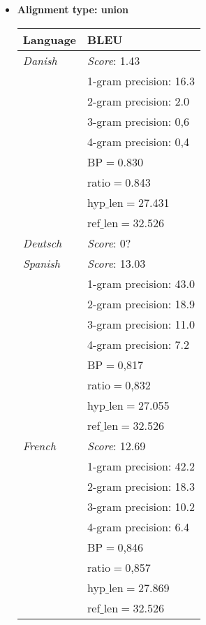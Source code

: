 \documentclass[11pt]{article}
\begin{document}
\begin{itemize}
\newpage
\item \textbf{Alignment type: union}

\begin{center}
    \begin{tabular}{ | l | l |}
    \hline
    \textbf{Language} & \textbf{BLEU} \\ 
    \hline
    \textit{Danish} & \textit{Score}: 1.43 \\
    & 1-gram precision: 16.3 \\
    & 2-gram precision: 2.0 \\
    & 3-gram precision: 0,6 \\
    & 4-gram precision: 0,4 \\
    & BP$=$0.830 \\
    & ratio$=$0.843 \\
    & hyp$\_$len$=$27.431 \\
    & ref$\_$len$=$32.526\\
    \hline
    \textit{Deutsch} & \textit{Score}: 0? \\
    \hline
    \textit{Spanish} & \textit{Score}: 13.03 \\
    & 1-gram precision: 43.0 \\
    & 2-gram precision: 18.9 \\
    & 3-gram precision: 11.0 \\
    & 4-gram precision: 7.2 \\
    & BP$=$0,817 \\
    & ratio$=$0,832 \\
    & hyp$\_$len$=$27.055 \\
    & ref$\_$len$=$32.526\\
    \hline
    \textit{French} & \textit{Score}: 12.69 \\
    & 1-gram precision: 42.2 \\
    & 2-gram precision: 18.3 \\
    & 3-gram precision: 10.2 \\
    & 4-gram precision: 6.4 \\
    & BP$=$0,846 \\
    & ratio$=$0,857 \\
    & hyp$\_$len$=$27.869 \\
    & ref$\_$len$=$32.526\\
    \hline %
    \end{tabular}
    

\end{center}
\end{itemize}
\end{document}
